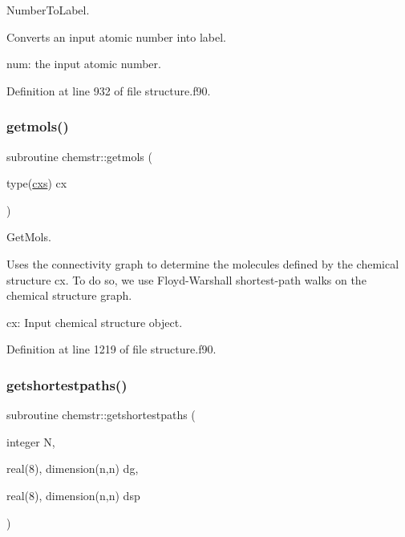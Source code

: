 Number\+To\+Label. 

Converts an input atomic number into label.


\begin{DoxyItemize}
\item num\+: the input atomic number. 
\end{DoxyItemize}

Definition at line 932 of file structure.\+f90.

\mbox{\label{namespacechemstr_a6c05b1170d09857c530676740c349725}} 
\subsubsection{\texorpdfstring{getmols()}{getmols()}}
{\footnotesize\ttfamily subroutine chemstr\+::getmols (\begin{DoxyParamCaption}\item[{type(\mbox{\hyperlink{structchemstr_1_1cxs}{cxs}})}]{cx }\end{DoxyParamCaption})}



Get\+Mols. 

Uses the connectivity graph to determine the molecules defined by the chemical structure cx. To do so, we use Floyd-\/\+Warshall shortest-\/path walks on the chemical structure graph.


\begin{DoxyItemize}
\item cx\+: Input chemical structure object. 
\end{DoxyItemize}

Definition at line 1219 of file structure.\+f90.

\mbox{\label{namespacechemstr_a20710db5ffd66de18dfaad9f0e9c821a}} 
\subsubsection{\texorpdfstring{getshortestpaths()}{getshortestpaths()}}
{\footnotesize\ttfamily subroutine chemstr\+::getshortestpaths (\begin{DoxyParamCaption}\item[{integer}]{N,  }\item[{real(8), dimension(n,n)}]{dg,  }\item[{real(8), dimension(n,n)}]{dsp }\end{DoxyParamCaption})}



